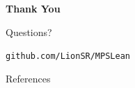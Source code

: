 \documentclass[aspectratio=169,10pt]{beamer}
\begin{document}
{%
\begin{frame}
    \begin{center}
        \vspace{2em}
        \Huge\textbf{\textcolor{leangreen}{Thank You}}

        \vspace{1.2em}
        \LARGE Questions?

        \vspace{1.5em}
        \large\texttt{github.com/LionSR/MPSLean}
    \end{center}
\end{frame}
}

\begin{frame}[allowframebreaks]{References}

\end{frame}
\end{document}
